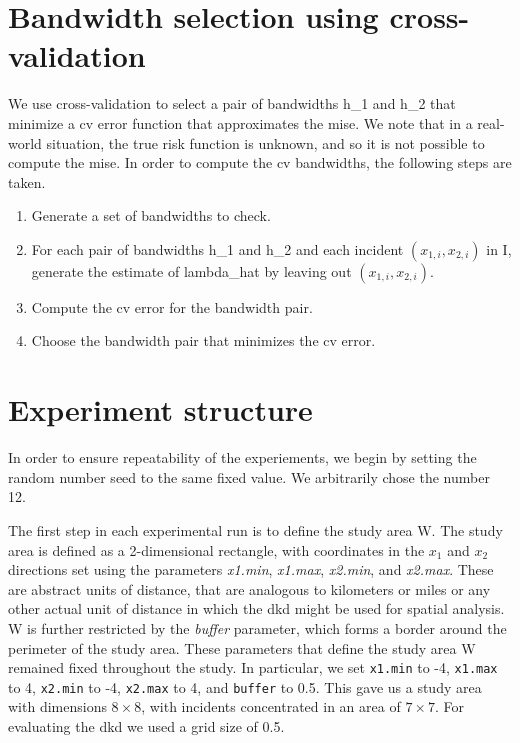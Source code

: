 \section{Bandwidth selection using cross-validation}
\label{sec:method:cross-validation}

We use cross-validation to select a pair of bandwidths \gls{h_1} and \gls{h_2} that minimize a \gls{cv} error function that approximates the \gls{mise}.
We note that in a real-world situation, the true risk function is unknown, and so it is not possible to compute the \gls{mise}.
In order to compute the \gls{cv} bandwidths, the following steps are taken.
\begin{enumerate}
    \item Generate a set of bandwidths to check.
    \item For each pair of bandwidths \gls{h_1} and \gls{h_2} and each incident $(x_{1,i}, x_{2,i})$ in \gls{I}, generate the estimate of \gls{lambda_hat} by leaving out $(x_{1,i}, x_{2,i})$.
    \item Compute the \gls{cv} error for the bandwidth pair.
    \item Choose the bandwidth pair that minimizes the \gls{cv} error.
\end{enumerate}


\section{Experiment structure}
\label{sec:method:experiment_structure}

In order to ensure repeatability of the experiements, we begin by setting the random number seed to the same fixed value.
We arbitrarily chose the number 12.

The first step in each experimental run is to define the study area \gls{W}. 
The study area is defined as a 2-dimensional rectangle, with coordinates in the $x_1$ and $x_2$ directions set using the parameters \textit{x1.min}, \textit{x1.max}, \textit{x2.min}, and \textit{x2.max}.
These are abstract units of distance, that are analogous to kilometers or miles or any other actual unit of distance in which the \gls{dkd} might be used for spatial analysis.
\Gls{W} is further restricted by the \textit{buffer} parameter, which forms a border around the perimeter of the study area.
These parameters that define the study area \gls{W} remained fixed throughout the study.
In particular, we set \texttt{x1.min} to -4, \texttt{x1.max} to 4, \texttt{x2.min} to -4, \texttt{x2.max} to 4, and \texttt{buffer} to 0.5.
This gave us a study area with dimensions $8 \times 8$, with incidents concentrated in an area of $7 \times 7$.
For evaluating the \gls{dkd} we used a grid size of 0.5.

